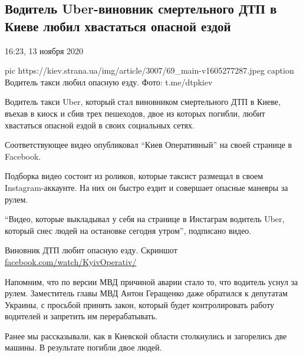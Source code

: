  
 

 

\subsection{Водитель Uber-виновник смертельного ДТП в Киеве любил хвастаться опасной ездой}

16:23, 13 ноября 2020

\ifcmt
pic https://kiev.strana.ua/img/article/3007/69_main-v1605277287.jpeg
caption Водитель такси любил опасную езду. Фото: t.me/dtpkiev
\fi

Водитель такси Uber, который стал виновником смертельного ДТП в Киеве,
въехав в киоск и сбив трех пешеходов, двое из которых погибли, любит
хвастаться опасной ездой в своих социальных сетях.

Соответствующее видео опубликовал \enquote{Киев Оперативный} на своей странице в
Facebook.

Подборка видео состоит из роликов, которые таксист размещал в
своем Instagram-аккаунте. На них он быстро ездит и совершает опасные
маневры за рулем.

\enquote{Видео, которые выкладывал у себя на странице в Инстаграм водитель Uber,
который снес людей на остановке сегодня утром}, \dshM подписано видео.

Виновник ДТП любит опасную езду. Скриншот \url{facebook.com/watch/KyivOperativ/}

Напомним, что по версии МВД причиной аварии стало то, что водитель уснул
за рулем. Заместитель главы МВД Антон Геращенко даже обратился к депутатам
Украины, с просьбой принять закон, который будет контролировать работу
водителей и запретить им перерабатывать. 

Ранее мы рассказывали, как в Киевской области столкнулись и загорелись две
машины. В результате погибли двое людей.

